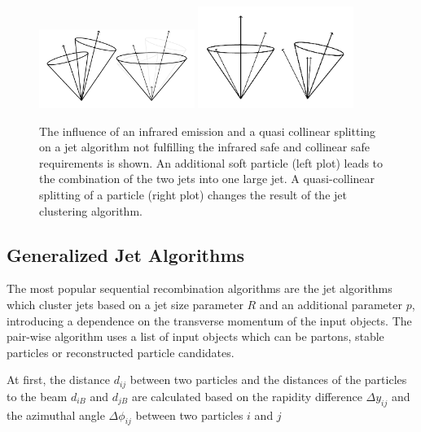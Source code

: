 \begin{figure}[htb]
    \centering
    \includegraphics[width=0.45\textwidth]{figures/drawings/infrared_safety/jetinfrared.pdf}\hfill
    \includegraphics[width=0.45\textwidth]{figures/drawings/infrared_safety/jetcollinear.pdf}
    \caption[Effect of infrared emissions and collinear splittings on jet
    algorithms]{The influence of an infrared emission and a quasi
        collinear splitting on a jet algorithm not fulfilling the infrared safe
        and collinear safe requirements is shown. An additional soft particle (left plot)
    leads to the combination of the two jets into one large jet. A
quasi-collinear splitting of a particle (right plot) changes the result of the
jet clustering algorithm.}
    \label{fig:infrared_safety}
\end{figure}

\subsection{Generalized \kt Jet Algorithms}

The most popular sequential recombination algorithms are the \kt jet
algorithms which cluster jets based on a jet size parameter $R$ and an
additional parameter $p$, introducing a dependence on the transverse momentum of
the input objects. The pair-wise algorithm uses a list of input objects which
can be partons, stable particles or reconstructed particle candidates.

At first, the distance $d_{ij}$ between two particles and the distances of the
particles to the beam $d_{iB}$ and $d_{jB}$ are calculated based on the rapidity
difference $\Delta y_{ij}$ and the azimuthal angle $\Delta \phi_{ij}$ between two
particles $i$ and $j$

